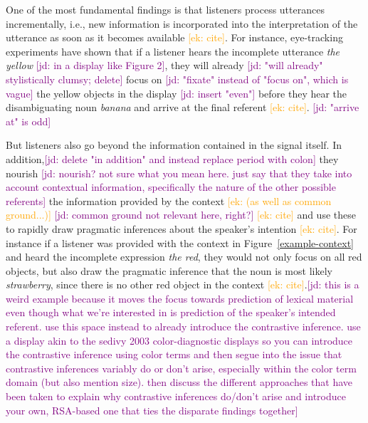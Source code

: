 \documentclass[10pt,letterpaper]{article}
\newcommand{\ek}[1]{\textcolor{Orange}{[ek: #1]}}
\newcommand{\jd}[1]{\textcolor{Purple}{[jd: #1]}}
\begin{document}
One of the most fundamental findings is that listeners process utterances incrementally, i.e., new information is incorporated into the interpretation of the utterance as soon as it becomes available \ek{cite}. For instance, eye-tracking experiments have shown that if a listener hears the incomplete utterance \textit{the yellow} \jd{in a display like Figure 2}, they will already \jd{"will already" stylistically clumsy; delete} focus on \jd{"fixate" instead of "focus on", which is vague} the yellow objects in the display \jd{insert "even"} before they hear the disambiguating noun \textit{banana} and arrive at the final referent \ek{cite}. \jd{"arrive at" is odd}

But listeners also go beyond the information contained in the signal itself. In addition,\jd{delete "in addition" and instead replace period with colon} they nourish \jd{nourish? not sure what you mean here. just say that they take into account contextual information, specifically the nature of the other possible referents} the information provided by the context \ek{(as well as common ground...)} \jd{common ground not relevant here, right?} \ek{cite} and use these to rapidly draw pragmatic inferences about the speaker's intention \ek{cite}. For instance if a listener was provided with the context in Figure~\ref{example-context} and heard the incomplete expression \textit{the red}, they would not only focus on all red objects, but also draw the pragmatic inference that the noun is most likely \textit{strawberry}, since there is no other red object in the context \ek{cite}.\jd{this is a weird example because it moves the focus towards prediction of lexical material even though what we're interested in is prediction of the speaker's intended referent. use this space instead to already introduce the contrastive inference. use a display akin to the sedivy 2003 color-diagnostic displays so you can introduce the contrastive inference using color terms and then segue into the issue that contrastive inferences variably do or don't arise, especially within the color term domain (but also mention size). then discuss the different approaches that have been taken to explain why contrastive inferences do/don't arise and introduce your own, RSA-based one that ties the disparate findings together}
\end{document}
